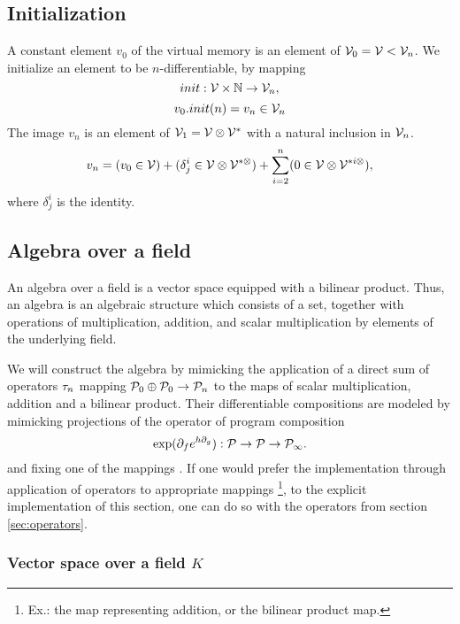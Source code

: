 \subsection{Initialization}

A constant element $v_0$ of the virtual memory is an element of $\mathcal{V}_0=\mathcal{V}<\mathcal{V}_n$. We initialize an element to be $n$-differentiable, by mapping
\begin{equation}
init:\mathcal{V}\times\mathbb{N}\to\mathcal{V}_n,
\end{equation}
\begin{equation}
v_0.init(n)=v_n\in\mathcal{V}_n
\end{equation}
The image $v_n$ is an element of $\mathcal{V}_1=\mathcal{V}\otimes\mathcal{V}^*$ with a natural inclusion in $\mathcal{V}_n$.
\begin{equation}
v_n=(v_0\in\mathcal{V})+(\delta^i_j\in\mathcal{V}\otimes\mathcal{V}^ {*\otimes})+\sum\limits_{i=2}^n(0\in\mathcal{V}\otimes\mathcal{V}^ {*i\otimes}),
\end{equation}
where $\delta^i_j$ is the identity.

\subsection{Algebra over a field}\label{sec:Algebra}

 An algebra over a field is a vector space equipped with a bilinear product. Thus, an algebra is an algebraic structure which consists of a set, together with operations of multiplication, addition, and scalar multiplication by elements of the underlying field. \cite[p.~3]{Algebra}
 
We will construct the algebra by mimicking the application of a direct sum of operators $\tau_n$ mapping $\mathcal{P}_0\oplus\mathcal{P}_0\to\mathcal{P}_n$ to the maps of scalar multiplication, addition and a bilinear product. 
Their differentiable compositions are modeled by mimicking projections of the operator of program composition \cite[Theorem~5.3]{OperationalCalculus}
 \begin{equation}\label{eq:kom}
   \exp(\partial_fe^{h\partial_g}): \mathcal{P}\to \mathcal{P}\to\mathcal{P}_\infty.
   \end{equation}
and fixing one of the mappings \cite[eq.~44,~45]{OperationalCalculus}. If one would prefer the implementation through application of operators to appropriate mappings
\footnote{Ex.: the map representing addition, or the bilinear product map.},
to the explicit implementation of this section, one can do so with the operators from section \ref{sec:operators}.

\subsubsection{Vector space over a field $K$}\label{sec:vectorSpace}
 
